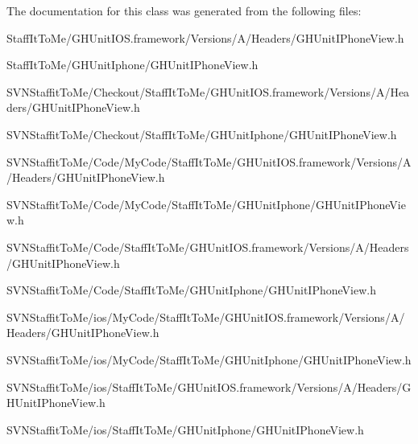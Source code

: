 \-The documentation for this class was generated from the following files\-:\begin{DoxyCompactItemize}
\item 
\-Staff\-It\-To\-Me/\-G\-H\-Unit\-I\-O\-S.\-framework/\-Versions/\-A/\-Headers/\-G\-H\-Unit\-I\-Phone\-View.\-h\item 
\-Staff\-It\-To\-Me/\-G\-H\-Unit\-Iphone/\-G\-H\-Unit\-I\-Phone\-View.\-h\item 
\-S\-V\-N\-Staffit\-To\-Me/\-Checkout/\-Staff\-It\-To\-Me/\-G\-H\-Unit\-I\-O\-S.\-framework/\-Versions/\-A/\-Headers/\-G\-H\-Unit\-I\-Phone\-View.\-h\item 
\-S\-V\-N\-Staffit\-To\-Me/\-Checkout/\-Staff\-It\-To\-Me/\-G\-H\-Unit\-Iphone/\-G\-H\-Unit\-I\-Phone\-View.\-h\item 
\-S\-V\-N\-Staffit\-To\-Me/\-Code/\-My\-Code/\-Staff\-It\-To\-Me/\-G\-H\-Unit\-I\-O\-S.\-framework/\-Versions/\-A/\-Headers/\-G\-H\-Unit\-I\-Phone\-View.\-h\item 
\-S\-V\-N\-Staffit\-To\-Me/\-Code/\-My\-Code/\-Staff\-It\-To\-Me/\-G\-H\-Unit\-Iphone/\-G\-H\-Unit\-I\-Phone\-View.\-h\item 
\-S\-V\-N\-Staffit\-To\-Me/\-Code/\-Staff\-It\-To\-Me/\-G\-H\-Unit\-I\-O\-S.\-framework/\-Versions/\-A/\-Headers/\-G\-H\-Unit\-I\-Phone\-View.\-h\item 
\-S\-V\-N\-Staffit\-To\-Me/\-Code/\-Staff\-It\-To\-Me/\-G\-H\-Unit\-Iphone/\-G\-H\-Unit\-I\-Phone\-View.\-h\item 
\-S\-V\-N\-Staffit\-To\-Me/ios/\-My\-Code/\-Staff\-It\-To\-Me/\-G\-H\-Unit\-I\-O\-S.\-framework/\-Versions/\-A/\-Headers/\-G\-H\-Unit\-I\-Phone\-View.\-h\item 
\-S\-V\-N\-Staffit\-To\-Me/ios/\-My\-Code/\-Staff\-It\-To\-Me/\-G\-H\-Unit\-Iphone/\-G\-H\-Unit\-I\-Phone\-View.\-h\item 
\-S\-V\-N\-Staffit\-To\-Me/ios/\-Staff\-It\-To\-Me/\-G\-H\-Unit\-I\-O\-S.\-framework/\-Versions/\-A/\-Headers/\-G\-H\-Unit\-I\-Phone\-View.\-h\item 
\-S\-V\-N\-Staffit\-To\-Me/ios/\-Staff\-It\-To\-Me/\-G\-H\-Unit\-Iphone/\-G\-H\-Unit\-I\-Phone\-View.\-h\end{DoxyCompactItemize}
